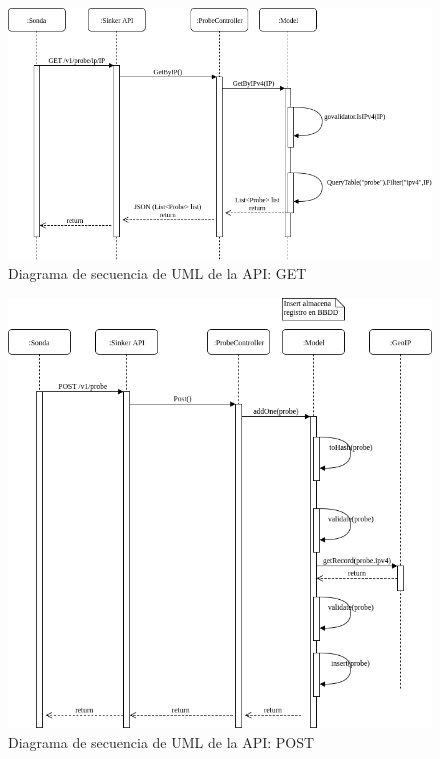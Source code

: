 \begin{figure}[htp]
    \centering
      \includegraphics[scale=0.6]{images/UMLSequenceGetProbe}
    \caption{Diagrama de secuencia de UML de la API: GET}
    \label{fig:uml-sequence-get-probe}
\end{figure}

\begin{figure}[htp]
    \centering
      \includegraphics[scale=0.6]{images/UMLSequencePostProbe}
    \caption{Diagrama de secuencia de UML de la API: POST}
    \label{fig:uml-sequence-post-probe}
\end{figure}

